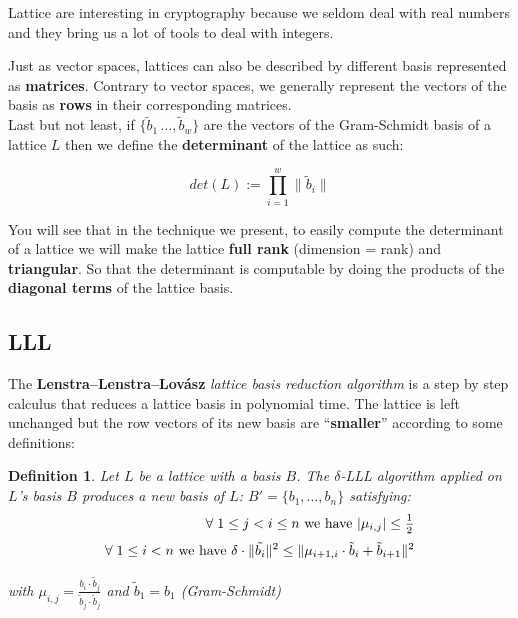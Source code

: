 \documentclass[a4paper,11pt]{article}
\newtheorem{definition}{Definition}
\begin{document}
Lattice are interesting in cryptography because we seldom deal with real numbers and they bring us a lot of tools to deal with integers.

Just as vector spaces, lattices can also be described by different basis represented as \textbf{matrices}. Contrary to vector spaces, we generally represent the vectors of the basis as \textbf{rows} in their corresponding matrices.\\

Last but not least, if $\{\tilde{b}_1\,\hdots,\tilde{b}_w\}$ are the vectors of the Gram-Schmidt basis of a lattice $L$ then we define the \textbf{determinant} of the lattice as such:

\[ det(L) := \prod_{i=1}^{w} \|\tilde{b}_i\| \]

You will see that in the technique we present, to easily compute the determinant of a lattice we will make the lattice \textbf{full rank} (dimension = rank) and \textbf{triangular}. So that the determinant is computable by doing the products of the \textbf{diagonal terms} of the lattice basis.

\subsection{LLL}

The \textbf{Lenstra–Lenstra–Lovász} \textit{lattice basis reduction algorithm} is a step by step calculus that reduces a lattice basis in polynomial time. The lattice is left unchanged but the row vectors of its new basis are ``\textbf{smaller}'' according to some definitions:

\begin{definition}
Let $L$ be a lattice with a basis $B$. The $\delta$-LLL algorithm applied on $L$'s basis $B$ produces a new basis of $L$: $B' = \{b_1,\hdots,b_n\}$ satisfying:
\begin{eqnarray}
\forall \hspace{1mm} 1 \leq j < i \leq n \text{ we have } |\mu_{i,j}| \leq \frac{_1}{^2}\\
\forall \hspace{1mm} 1 \leq i < n \text{ we have } \delta \cdot \|\tilde{b_i}\|^2 \leq \| \mu_{i+1,i}\cdot \tilde{b}_i + \tilde{b}_{i + 1}\|^2
\end{eqnarray}
\begin{center}
with $\mu_{i,j} = \frac{b_i \cdot \tilde{b}_j}{\tilde{b}_j \cdot \tilde{b}_j}$ and $\tilde{b}_1 = b_1$ (Gram-Schmidt)
\end{center}
\end{definition}
\end{document}
